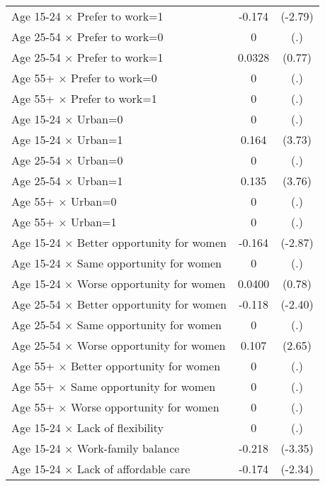 {\begin{longtable}{l*{1}{cc}}
Age 15-24 $\times$ Prefer to work=1&      -0.174\sym{**} &     (-2.79)\\
Age 25-54 $\times$ Prefer to work=0&           0         &         (.)\\
Age 25-54 $\times$ Prefer to work=1&      0.0328         &      (0.77)\\
Age 55+ $\times$ Prefer to work=0&           0         &         (.)\\
Age 55+ $\times$ Prefer to work=1&           0         &         (.)\\
Age 15-24 $\times$ Urban=0&           0         &         (.)\\
Age 15-24 $\times$ Urban=1&       0.164\sym{***}&      (3.73)\\
Age 25-54 $\times$ Urban=0&           0         &         (.)\\
Age 25-54 $\times$ Urban=1&       0.135\sym{***}&      (3.76)\\
Age 55+ $\times$ Urban=0&           0         &         (.)\\
Age 55+ $\times$ Urban=1&           0         &         (.)\\
Age 15-24 $\times$ Better opportunity for women&      -0.164\sym{**} &     (-2.87)\\
Age 15-24 $\times$ Same opportunity for women&           0         &         (.)\\
Age 15-24 $\times$ Worse opportunity for women&      0.0400         &      (0.78)\\
Age 25-54 $\times$ Better opportunity for women&      -0.118\sym{*}  &     (-2.40)\\
Age 25-54 $\times$ Same opportunity for women&           0         &         (.)\\
Age 25-54 $\times$ Worse opportunity for women&       0.107\sym{**} &      (2.65)\\
Age 55+ $\times$ Better opportunity for women&           0         &         (.)\\
Age 55+ $\times$ Same opportunity for women&           0         &         (.)\\
Age 55+ $\times$ Worse opportunity for women&           0         &         (.)\\
Age 15-24 $\times$ Lack of flexibility&           0         &         (.)\\
Age 15-24 $\times$ Work-family balance&      -0.218\sym{***}&     (-3.35)\\
Age 15-24 $\times$ Lack of affordable care&      -0.174\sym{*}  &     (-2.34)\\

\end{longtable}}
